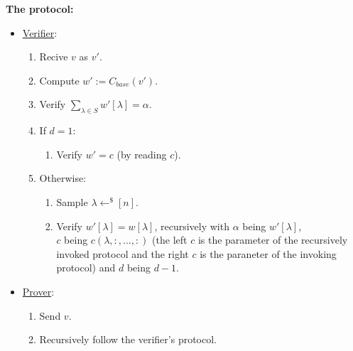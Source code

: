 \textbf{The protocol:}
\begin{itemize}
    \item \underline{Verifier}:
    \begin{enumerate}
        \item Recive $v$ as $v'$.
        \item Compute $w':=C_{base}(v')$.
        \item Verify $\sum_{\lambda\in S}w'[\lambda]=\alpha$.
        \item If $d=1$:
        \begin{enumerate}
            \item Verify $w'=c$ (by reading $c$).
        \end{enumerate}
        \item Otherwise:
        \begin{enumerate}
            \item Sample $\lambda\leftarrow^\$[n]$.
            \item Verify $w'[\lambda]=w[\lambda]$, recursively
                with $\alpha$ being $w'[\lambda]$,\\
                $c$ being $c(\lambda,:,...,:)$
                (the left $c$ is the parameter of the recursively
                invoked protocol and the right $c$ is the paraneter of the invoking protocol)
                and $d$ being $d-1$.
        \end{enumerate}
    \end{enumerate}
    \item \underline{Prover}:
    \begin{enumerate}
        \item Send $v$.
        \item Recursively follow the verifier's protocol.
    \end{enumerate}
\end{itemize}

